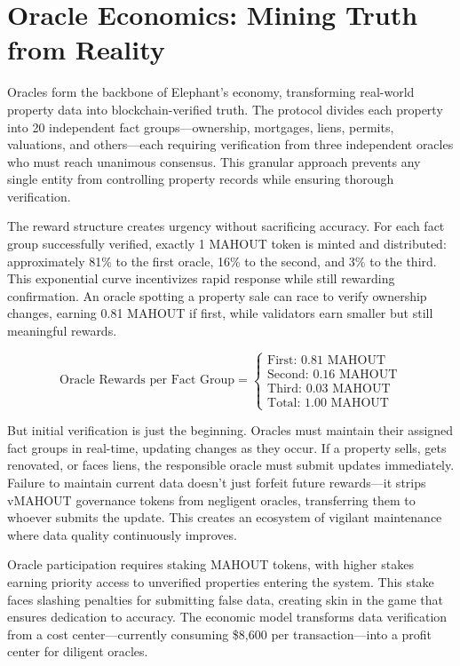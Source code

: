 \section{Oracle Economics: Mining Truth from Reality}

Oracles form the backbone of Elephant's economy, transforming real-world property data into blockchain-verified truth. The protocol divides each property into 20 independent fact groups—ownership, mortgages, liens, permits, valuations, and others—each requiring verification from three independent oracles who must reach unanimous consensus. This granular approach prevents any single entity from controlling property records while ensuring thorough verification.

The reward structure creates urgency without sacrificing accuracy. For each fact group successfully verified, exactly 1 MAHOUT token is minted and distributed: approximately 81\% to the first oracle, 16\% to the second, and 3\% to the third. This exponential curve incentivizes rapid response while still rewarding confirmation. An oracle spotting a property sale can race to verify ownership changes, earning 0.81 MAHOUT if first, while validators earn smaller but still meaningful rewards.

\[
\text{Oracle Rewards per Fact Group} = \begin{cases}
\text{First: } 0.81 \text{ MAHOUT} \\
\text{Second: } 0.16 \text{ MAHOUT} \\
\text{Third: } 0.03 \text{ MAHOUT} \\
\text{Total: } 1.00 \text{ MAHOUT}
\end{cases}
\]

But initial verification is just the beginning. Oracles must maintain their assigned fact groups in real-time, updating changes as they occur. If a property sells, gets renovated, or faces liens, the responsible oracle must submit updates immediately. Failure to maintain current data doesn't just forfeit future rewards—it strips vMAHOUT governance tokens from negligent oracles, transferring them to whoever submits the update. This creates an ecosystem of vigilant maintenance where data quality continuously improves.

Oracle participation requires staking MAHOUT tokens, with higher stakes earning priority access to unverified properties entering the system. This stake faces slashing penalties for submitting false data, creating skin in the game that ensures dedication to accuracy. The economic model transforms data verification from a cost center—currently consuming \$8,600 per transaction—into a profit center for diligent oracles.

